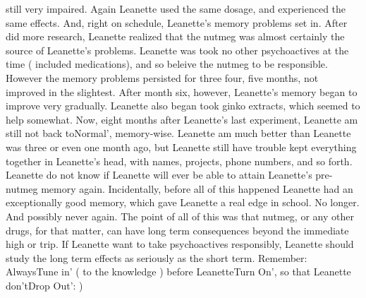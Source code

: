 \documentclass[12pt]{book}
\begin{document}
still very impaired. Again Leanette used the same dosage, and experienced the same effects. And, right on schedule, Leanette's memory problems set in. After did more research, Leanette realized that the nutmeg was almost certainly the source of Leanette's problems. Leanette was took no other psychoactives at the time ( included medications), and so beleive the nutmeg to be responsible. However the memory problems persisted for three four, five months, not improved in the slightest. After month six, however, Leanette's memory began to improve very gradually. Leanette also began took ginko extracts, which seemed to help somewhat. Now, eight months after Leanette's last experiment, Leanette am still not back toNormal', memory-wise. Leanette am much better than Leanette was three or even one month ago, but Leanette still have trouble kept everything together in Leanette's head, with names, projects, phone numbers, and so forth. Leanette do not know if Leanette will ever be able to attain Leanette's pre-nutmeg memory again. Incidentally, before all of this happened Leanette had an exceptionally good memory, which gave Leanette a real edge in school. No longer. And possibly never again. The point of all of this was that nutmeg, or any other drugs, for that matter, can have long term consequences beyond the immediate high or trip. If Leanette want to take psychoactives responsibly, Leanette should study the long term effects as seriously as the short term. Remember: AlwaysTune in' ( to the knowledge ) before LeanetteTurn On', so that Leanette don'tDrop Out': )
\end{document}
